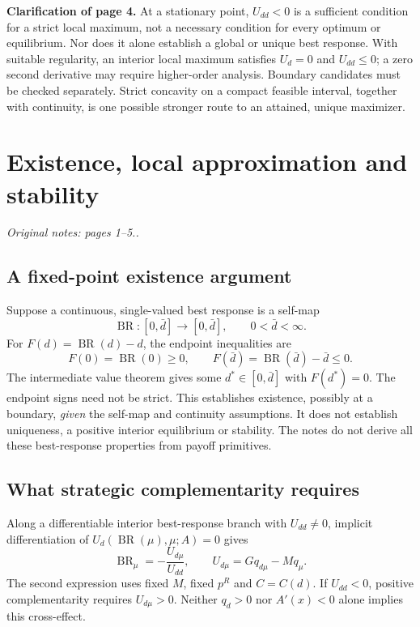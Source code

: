 \documentclass[11pt,a4paper]{article}
\newcommand{\BR}{\operatorname{BR}}
\newcommand{\sourcepage}[1]{\textit{Original notes: #1.}}
\begin{document}
\textbf{Clarification of page 4.} At a stationary point, $U_{dd}<0$ is a
sufficient condition for a strict local maximum, not a necessary condition for
every optimum or equilibrium. Nor does it alone establish a global or unique
best response. With suitable regularity, an interior local maximum satisfies
$U_d=0$ and $U_{dd}\leq0$; a zero second derivative may require higher-order
analysis. Boundary candidates must be checked separately. Strict concavity on
a compact feasible interval, together with continuity, is one possible stronger
route to an attained, unique maximizer.

\section{Existence, local approximation and stability}
\sourcepage{pages 1--5.}

\subsection{A fixed-point existence argument}
Suppose a continuous, single-valued best response is a self-map
\[
 \BR:[0,\bar d]\longrightarrow[0,\bar d],\qquad 0<\bar d<\infty.
\]
For $F(d)=\BR(d)-d$, the endpoint inequalities are
\[
 F(0)=\BR(0)\geq0,\qquad F(\bar d)=\BR(\bar d)-\bar d\leq0.
\]
The intermediate value theorem gives some $d^*\in[0,\bar d]$ with
$F(d^*)=0$. The endpoint signs need not be strict. This establishes existence,
possibly at a boundary, \emph{given} the self-map and continuity assumptions.
It does not establish uniqueness, a positive interior equilibrium or stability.
The notes do not derive all these best-response properties from payoff primitives.

\subsection{What strategic complementarity requires}
Along a differentiable interior best-response branch with $U_{dd}\ne0$,
implicit differentiation of $U_d(\BR(\mu),\mu;A)=0$ gives
\begin{equation}
 \BR_\mu=-\frac{U_{d\mu}}{U_{dd}},\qquad
 U_{d\mu}=Gq_{d\mu}-Mq_\mu. \label{eq:brslope}
\end{equation}
The second expression uses fixed $M$, fixed $p^R$ and $C=C(d)$. If
$U_{dd}<0$, positive complementarity requires $U_{d\mu}>0$. Neither
$q_d>0$ nor $A'(x)<0$ alone implies this cross-effect.
\end{document}
